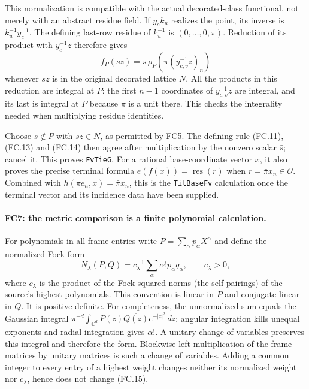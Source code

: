 \documentclass[11pt,a4paper]{article}
\numberwithin{equation}{section}
\theoremstyle{remark}\newtheorem{remark}[theorem]{Remark}
\begin{document}
This normalization is compatible with the actual decorated-class
functional, not merely with an abstract residue field. If $y_ck_u$
realizes the point, its inverse is $k_u^{-1}y_c^{-1}$. The defining
last-row residue of $k_u^{-1}$ is
$(0,\ldots,0,\bar\pi)$. Reduction of its product with
$y_c^{-1}z$ therefore gives
\[
 f_P(sz)=\bar s\,\rho_P\!\left(
        \bar\pi (y_{c,v}^{-1}z)_n\right)               \tag{FC.14}
\]
whenever $sz$ is in the original decorated lattice $N$.
All the products in this reduction are integral at $P$: the first
$n-1$ coordinates of $y_{c,v}^{-1}z$ are integral, and its last is
integral at $P$ because $\bar\pi$ is a unit there. This checks the
integrality needed when multiplying residue identities.

Choose $s\notin P$ with $sz\in N$, as permitted by FC5.
The defining rule (FC.11), (FC.13) and (FC.14) then agree after
multiplication by the nonzero scalar $\bar s$; cancel it.
This proves \texttt{FvTieG}. For a rational base-coordinate vector
$x$, it also proves the precise terminal formula
$e(f(x))=\operatorname{res}(r)$ when $r=\bar\pi x_n\in\mathcal O$.
Combined with $h(\pi e_n,x)=\bar\pi x_n$, this is the
\texttt{TilBaseFv} calculation once the terminal vector and its
incidence data have been supplied.

\paragraph{FC7: the metric comparison is a finite polynomial calculation.}
For polynomials in all frame entries write
$P=\sum_\alpha p_\alpha X^\alpha$ and define the normalized Fock form
\[
 N_\lambda(P,Q)=c_\lambda^{-1}
       \sum_\alpha\alpha!p_\alpha\overline{q_\alpha},
 \qquad c_\lambda>0,                                  \tag{FC.15}
\]
where $c_\lambda$ is the product of the Fock squared norms (the
self-pairings) of the source's highest polynomials. This convention is linear in $P$ and conjugate
linear in $Q$. It is positive definite. For completeness, the unnormalized
sum equals the Gaussian integral
$\pi^{-d}\int_{\mathbb C^d}P(z)\overline{Q(z)}e^{-|z|^2}\,dz$:
angular integration kills unequal exponents and radial integration gives
$\alpha!$. A unitary change of variables preserves this integral and
therefore the form. Blockwise left multiplication of the frame matrices
by unitary matrices is such a change of variables. Adding a common
integer to every entry of a highest weight changes neither its
normalized weight nor $c_\lambda$, hence does not change (FC.15).
\end{document}
